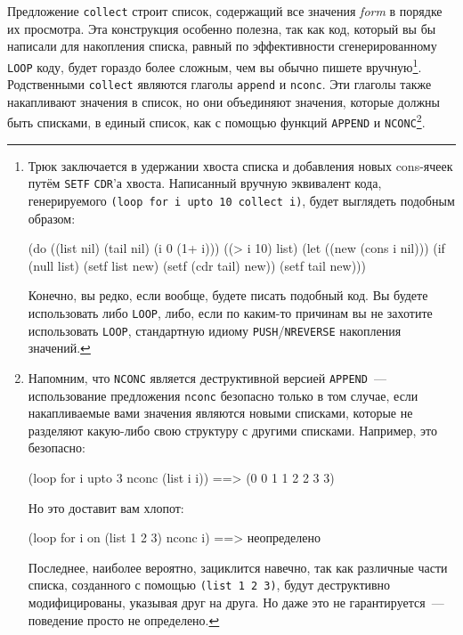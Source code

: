 Предложение \lstinline{collect} строит список, содержащий все значения \textit{form} в порядке
их просмотра. Эта конструкция особенно полезна, так как код, который вы бы написали для
накопления списка, равный по эффективности сгенерированному \lstinline{LOOP} коду, будет
гораздо более сложным, чем вы обычно пишете вручную\footnote{Трюк заключается в удержании
  хвоста списка и добавления новых cons-ячеек путём \lstinline{SETF} \lstinline{CDR}'а
  хвоста. Написанный вручную эквивалент кода, генерируемого \lstinline{(loop for i upto 10 collect i)},
  будет выглядеть подобным образом:

\begin{myverb}
(do ((list nil) (tail nil) (i 0 (1+ i)))
    ((> i 10) list)
  (let ((new (cons i nil)))
    (if (null list)
        (setf list new)
        (setf (cdr tail) new))
    (setf tail new)))
\end{myverb}

Конечно, вы редко, если вообще, будете писать подобный код. Вы будете использовать либо
\lstinline{LOOP}, либо, если по каким-то причинам вы не захотите использовать \lstinline{LOOP},
стандартную идиому \lstinline{PUSH}/\lstinline{NREVERSE} накопления значений.}\hspace{\footnotenegspace}. Родственными
\lstinline{collect} являются глаголы \lstinline{append} и \lstinline{nconc}.  Эти глаголы также
накапливают значения в список, но они объединяют значения, которые должны быть списками, в
единый список, как с помощью функций \lstinline{APPEND} и \lstinline{NCONC}\footnote{Напомним,
  что \lstinline{NCONC} является деструктивной версией \lstinline{APPEND}~--- использование
  предложения \lstinline{nconc} безопасно только в том случае, если накапливаемые вами значения
  являются новыми списками, которые не разделяют какую-либо свою структуру с другими
  списками. Например, это безопасно:

\begin{myverb}
(loop for i upto 3 nconc (list i i)) ==> (0 0 1 1 2 2 3 3)
\end{myverb}

Но это доставит вам хлопот:

\begin{myverb}
(loop for i on (list 1 2 3) nconc i) ==> неопределено
\end{myverb}

Последнее, наиболее вероятно, зациклится навечно, так как различные части списка, созданного
с помощью \lstinline{(list 1 2 3)}, будут деструктивно модифицированы, указывая друг на
друга. Но даже это не гарантируется~--- поведение просто не определено.}\hspace{\footnotenegspace}.

